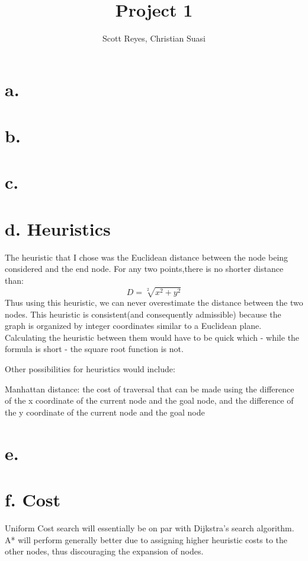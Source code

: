 \documentclass[12pt]{article}
\title{Project 1}
\author{Scott Reyes, Christian Suasi}
\begin{document}
	\maketitle
	\section*{a.}
	\section*{b.}
	\section*{c.}
	\section*{d. Heuristics}
	The heuristic that I chose was the Euclidean distance between the node being considered and the end node. For any two points,there is no shorter distance than: $$D=\sqrt[2]{x^2+y^2}$$
	Thus using this heuristic, we can never overestimate the distance between the two nodes. This heuristic is consistent(and consequently admissible) because the graph is organized by integer coordinates similar to a Euclidean plane. Calculating the heuristic between them would have to be quick which - while the formula is short - the square root function is not.

	Other possibilities for heuristics would include:

	Manhattan distance:	the cost of traversal that can be made using the difference of the x coordinate of the current node and the goal node, and the difference of the y coordinate of the current node and the goal node
	\section*{e.}
	\section*{f. Cost}
	Uniform Cost search will essentially be on par with Dijkstra's search algorithm. A* will perform generally better due to assigning higher heuristic costs to the other nodes, thus discouraging the expansion of nodes.
\end{document}
